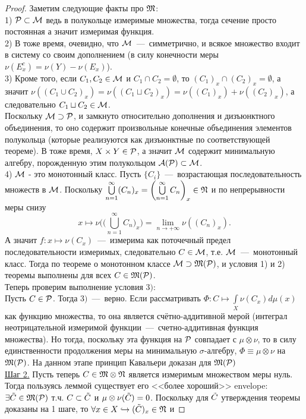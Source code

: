 \begin{proof}
    Заметим следующие факты про $\mathfrak{M}$: \\
    1)  $\mathcal{P} \subset \mathcal{M} $ ведь в полукольце измеримые множества, тогда сечение просто постоянная а значит измеримая функция.\\
    2) В тоже время, очевидно, что $\mathcal{M}$~---~симметрично, и всякое множество входит в систему со своим дополнением (в силу конечности меры $\nu(E_x^c) = \nu(Y) - \nu(E_x)$). \\
    3) Кроме того, если $C_1, C_2 \in \mathcal{M}$ и $C_1 \cap C_2 = \emptyset$, то $(C_1)_x \cap (C_2)_x = \emptyset$, а значит $\nu((C_1 \cup C_2)_x) = \nu((C_1 \sqcup C_2)_x) = \nu((C_1)_x) + \nu((C_2)_x)$, а следовательно $C_1 \sqcup C_2 \in \mathcal{M}$. \\
    Поскольку $\mathcal{M} \supset \mathcal{P}$, и замкнуто относительно дополнения и дизъюнктного объединения, то оно содержит произвольные конечные объединения элементов полукольца (которые реализуются как дизъюнктные по соответствующей теореме). В тоже время, $X \times Y \in \mathcal{P}$, а значит $\mathcal{M}$ содержит минимальную алгебру, порожденную этим полукольцом $\mathcal{A}(\mathcal{P})\subset\mathcal{M} $. \\
    4) $\mathcal{M}$ - это монотонный класс. Пусть $\{C_i\}$~---~возрастающая последовательность множеств в $\mathcal{M}$. Поскольку $\bigcup\limits_{n = 1}^\infty (C_n)_x = \biggl(\bigcup\limits_{n = 1}^\infty C_n\biggr)_x \in \mathfrak{N}$ и по непрерывности меры снизу \[x \mapsto \nu\biggl(\biggl(\bigcup\limits_{n = 1}^\infty C_n\biggr)_x\biggr) = \lim\limits_{n \rightarrow +\infty} \nu((C_n)_x).\]
    А значит $f: x \mapsto \nu(C_x)$~---~измерима как поточечный предел последовательности измеримых, следовательно $C \in \mathcal{M}$, т.е. $\mathcal{M}$~---~монотонный класс. Тогда по теореме о монотонном классе $\mathcal{M} \supset \mathfrak{M}(\mathcal{P})$, и условия 1) и 2) теоремы выполнены для всех $C \in \mathfrak{M}(\mathcal{P})$. \\
    Теперь проверим выполнение условия $3)$:\\ Пусть $C \in \mathcal{P}$. Тогда $3)$~---~верно. Если рассматривать $\Phi: C \mapsto \int\limits_{X} \nu(C_x)d\mu(x)$ как функцию множества, то она является счётно-аддитивной мерой (интеграл неотрицательной измеримой функции~---~счетно-аддитивная функция множества). Но тогда, поскольку эта функция на $\mathcal{P}$ совпадает с $\mu\otimes\nu$, то в силу единственности продолжения меры на минимальную $\sigma$-алгебру, $\Phi \equiv \mu\otimes\nu$ на $\mathfrak{M}(\mathcal{P})$. На данном этапе принцип Кавальери доказан для $\mathfrak{M}(\mathcal{P})$ \\
    \underline{Шаг 2.} Пусть теперь $C \in \mathfrak{M} \otimes \mathfrak{N}$ является измеримым множеством меры нуль. Тогда пользуясь леммой существует его <<более хороший>> envelope: $\exists \Tilde{C} \in \mathfrak{M}(\mathcal{P})$ т.ч. $ C \subset\Tilde{C} $ и $\mu\otimes\nu(\Tilde{C}) = 0$. Поскольку для $\Tilde{C}$ утверждения теоремы доказаны на 1 шаге, то $\forall x \in X \hookrightarrow (\Tilde{C})_x \in \mathfrak{N}$ и 

\end{proof}
